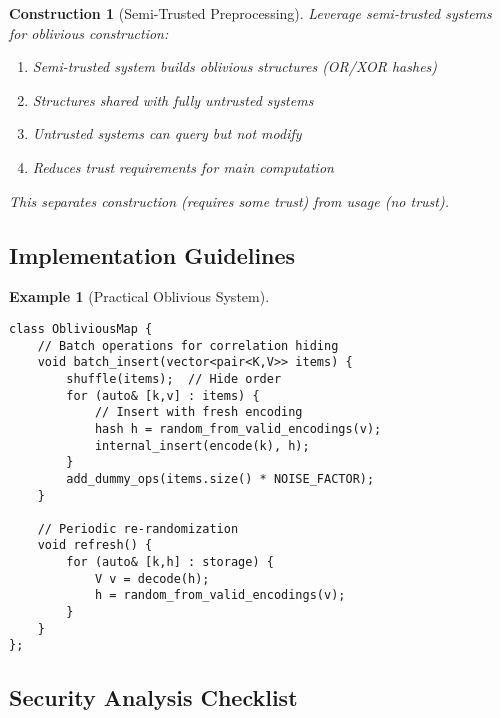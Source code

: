 \documentclass[11pt,final]{article}
\newtheorem{example}[theorem]{Example}
\newtheorem{construction}[theorem]{Construction}
\begin{document}
\begin{construction}[Semi-Trusted Preprocessing]
Leverage semi-trusted systems for oblivious construction:
\begin{enumerate}
    \item Semi-trusted system builds oblivious structures (OR/XOR hashes)
    \item Structures shared with fully untrusted systems
    \item Untrusted systems can query but not modify
    \item Reduces trust requirements for main computation
\end{enumerate}
This separates construction (requires some trust) from usage (no trust).
\end{construction}

\subsection{Implementation Guidelines}

\begin{example}[Practical Oblivious System]
\begin{verbatim}
class ObliviousMap {
    // Batch operations for correlation hiding
    void batch_insert(vector<pair<K,V>> items) {
        shuffle(items);  // Hide order
        for (auto& [k,v] : items) {
            // Insert with fresh encoding
            hash h = random_from_valid_encodings(v);
            internal_insert(encode(k), h);
        }
        add_dummy_ops(items.size() * NOISE_FACTOR);
    }
    
    // Periodic re-randomization
    void refresh() {
        for (auto& [k,h] : storage) {
            V v = decode(h);
            h = random_from_valid_encodings(v);
        }
    }
};
\end{verbatim}
\end{example}

\subsection{Security Analysis Checklist}
\end{document}
